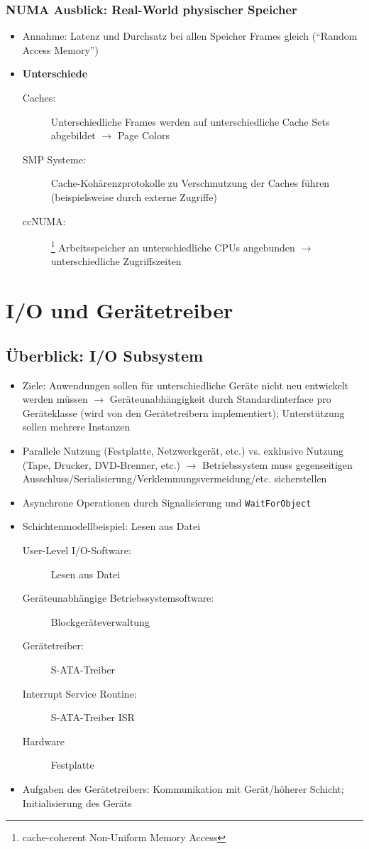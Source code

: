 \subsubsection{NUMA Ausblick: Real-World physischer Speicher}
\begin{itemize}
	\item Annahme: Latenz und Durchsatz bei allen Speicher Frames gleich ("`Random Access Memory"')
	\item \textbf{Unterschiede}
	\begin{description}
		\item[Caches:] Unterschiedliche Frames werden auf unterschiedliche Cache Sets abgebildet \(\rightarrow\) Page Colors
		\item[SMP Systeme:] Cache-Kohärenzprotokolle zu Verschmutzung der Caches führen (beispielsweise durch externe Zugriffe)
		\item[ccNUMA:]\footnote{cache-coherent Non-Uniform Memory Access} Arbeitsspeicher an unterschiedliche CPUs angebunden \(\rightarrow\) unterschiedliche Zugriffszeiten
	\end{description}
\end{itemize}



\section{I/O und Gerätetreiber}

\subsection{Überblick: I/O Subsystem}
\begin{itemize}
	\item Ziele: Anwendungen sollen für unterschiedliche Geräte nicht neu entwickelt werden müssen \(\rightarrow\) Geräteunabhängigkeit durch Standardinterface pro Geräteklasse (wird von den Gerätetreibern implementiert); Unterstützung sollen mehrere Instanzen
	\item Parallele Nutzung (Festplatte, Netzwerkgerät, etc.) vs. exklusive Nutzung (Tape, Drucker, DVD-Brenner, etc.) \(\rightarrow\) Betriebssystem muss gegenseitigen Ausschluss/Serialisierung/Verklemmungsvermeidung/etc. sicherstellen
	\item Asynchrone Operationen durch Signalisierung und \texttt{WaitForObject}
	\item Schichtenmodellbeispiel: Lesen aus Datei
	\begin{description}
		\item[User-Level I/O-Software:] Lesen aus Datei
		\item[Geräteunabhängige Betriebssystemsoftware:] Blockgeräteverwaltung
		\item[Gerätetreiber:] S-ATA-Treiber
		\item[Interrupt Service Routine:] S-ATA-Treiber ISR
		\item[Hardware] Festplatte
	\end{description}
	\item Aufgaben des Gerätetreibers: Kommunikation mit Gerät/höherer Schicht; Initialisierung des Geräts
\end{itemize}


